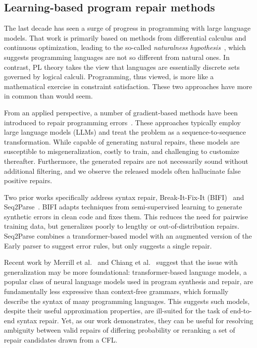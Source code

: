 \documentclass[sigplan,acmsmall,nonacm,screen]{acmart}\settopmatter{printfolios=false,printccs=false,printacmref=false}
\begin{document}
\subsection{Learning-based program repair methods}

The last decade has seen a surge of progress in programming with large language models. That work is primarily based on methods from differential calculus and continuous optimization, leading to the so-called \textit{naturalness hypothesis}~\cite{allamanis2018survey}, which suggests programming languages are not so different from natural ones. In contrast, PL theory takes the view that languages are essentially discrete sets governed by logical calculi. Programming, thus viewed, is more like a mathematical exercise in constraint satisfaction. These two approaches have more in common than would seem.

From an applied perspective, a number of gradient-based methods have been introduced to repair programming errors~\cite{allamanis2021self, chirkova2021empirical, drain2021generating}. These approaches typically employ large language models (LLMs) and treat the problem as a sequence-to-sequence transformation. While capable of generating natural repairs, these models are susceptible to misgeneralization, costly to train, and challenging to customize thereafter. Furthermore, the generated repairs are not necessarily sound without additional filtering, and we observe the released models often hallucinate false positive repairs.

Two prior works specifically address syntax repair, Break-It-Fix-It (BIFI)~\cite{yasunaga2021break} and Seq2Parse~\cite{sakkas2022seq2parse}. BIFI adapts techniques from semi-supervised learning to generate synthetic errors in clean code and fixes them. This reduces the need for pairwise training data, but generalizes poorly to lengthy or out-of-distribution repairs. Seq2Parse combines a transformer-based model with an augmented version of the Early parser to suggest error rules, but only suggests a single repair.

Recent work by Merrill et al.~\cite{merrill2022saturated} and Chiang et al.~\cite{chiang2023tighter} suggest that the issue with generalization may be more foundational: transformer-based language models, a popular class of neural language models used in program synthesis and repair, are fundamentally less expressive than context-free grammars, which formally describe the syntax of many programming languages. This suggests such models, despite their useful approximation properties, are ill-suited for the task of end-to-end syntax repair. Yet, as our work demonstrates, they can be useful for resolving ambiguity between valid repairs of differing probability or reranking a set of repair candidates drawn from a CFL.
\end{document}

